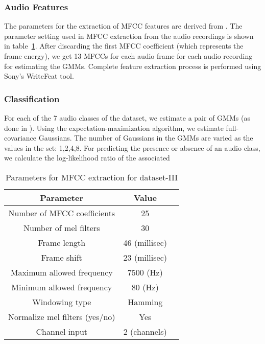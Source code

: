 \subsubsection{Audio Features}
The parameters for the extraction of MFCC features are derived from \cite{foster2015chime}. The parameter setting used in MFCC extraction from the audio recordings is shown in table~\ref{tab:param_mfcc_db3}. After discarding the first MFCC coefficient (which represents the frame energy), we get 13 MFCCs for each audio frame for each audio recording for estimating the GMMs. Complete feature extraction process is performed using Sony's WriteFeat tool.

\subsubsection{Classification}
For each of the 7 audio classes of the dataset, we estimate a pair of GMMs (as done in \cite{foster2015chime}). Using the expectation-maximization algorithm, we estimate full-covariance Gaussians. The number of Gaussians in the GMMs are varied as the values in the set: {1,2,4,8}. For predicting the presence or absence of an audio class, we calculate the log-likelihood ratio of the associated 

\begin{table}[tb]
\caption[Parameters for MFCC extraction for dataset-III]{Parameters for MFCC extraction for dataset-III}
\label{tab:param_mfcc_db3}
\centering
\begin{tabular}{ccc}
\toprule
Parameter & Value \\
\midrule
Number of MFCC coefficients	& 25\\
Number of mel filters	& 30\\
Frame length & 46 (millisec)\\
Frame shift 	& 23 (millisec)\\
Maximum allowed frequency & 7500 (Hz)\\
Minimum allowed frequency & 80 (Hz)\\
Windowing type & Hamming\\
Normalize mel filters (yes/no) & Yes \\
Channel input & 2 (channels) \\
\bottomrule 
\end{tabular}
\end{table}